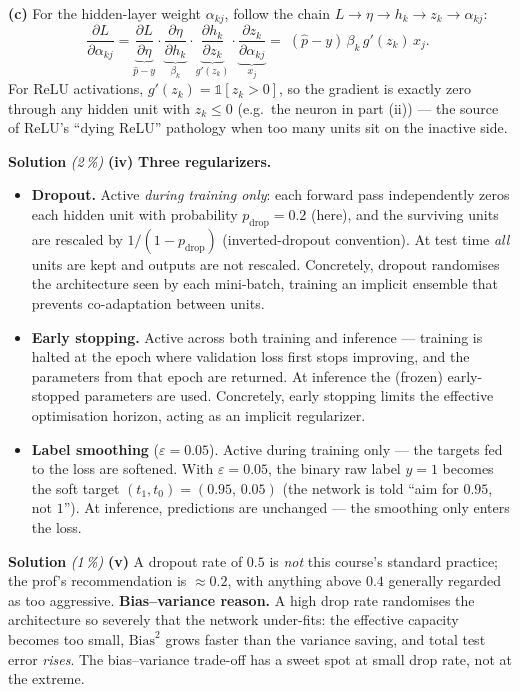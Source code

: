 \documentclass[11pt,a4paper]{article}
\newcommand{\subpoints}[1]{\textit{(#1\,\%)}}
\newcommand{\sol}{\noindent\textbf{Solution}}
\begin{document}
\textbf{(c)} For the hidden-layer weight $\alpha_{kj}$, follow the chain
$L \to \eta \to h_k \to z_k \to \alpha_{kj}$:
$$\frac{\partial L}{\partial\alpha_{kj}}
   = \underbrace{\frac{\partial L}{\partial\eta}}_{\hat p - y}\cdot
     \underbrace{\frac{\partial\eta}{\partial h_k}}_{\beta_k}\cdot
     \underbrace{\frac{\partial h_k}{\partial z_k}}_{g'(z_k)}\cdot
     \underbrace{\frac{\partial z_k}{\partial\alpha_{kj}}}_{x_j}
   = \boxed{\;(\hat p - y)\,\beta_k\, g'(z_k)\, x_j.\;}$$
For ReLU activations, $g'(z_k) = \mathbb 1[z_k > 0]$, so the gradient is exactly zero through any
hidden unit with $z_k \le 0$ (e.g.\ the neuron in part (ii)) --- the source of ReLU's ``dying ReLU''
pathology when too many units sit on the inactive side.

\medskip
\sol{} \subpoints{2} \textbf{(iv)} \textbf{Three regularizers.}
\begin{itemize}
  \item \textbf{Dropout.} Active \emph{during training only}: each forward pass independently zeros
        each hidden unit with probability $p_{\text{drop}} = 0.2$ (here), and the surviving units
        are rescaled by $1/(1 - p_{\text{drop}})$ (inverted-dropout convention). At test time
        \emph{all} units are kept and outputs are not rescaled. Concretely, dropout randomises the
        architecture seen by each mini-batch, training an implicit ensemble that prevents
        co-adaptation between units.
  \item \textbf{Early stopping.} Active across both training and inference --- training is halted
        at the epoch where validation loss first stops improving, and the parameters from that
        epoch are returned. At inference the (frozen) early-stopped parameters are used. Concretely,
        early stopping limits the effective optimisation horizon, acting as an implicit
        regularizer.
  \item \textbf{Label smoothing} ($\varepsilon = 0.05$). Active during training only --- the
        targets fed to the loss are softened. With $\varepsilon = 0.05$, the binary raw label
        $y = 1$ becomes the soft target $(t_1, t_0) = \boxed{(0.95,\, 0.05)}$ (the network is told
        ``aim for $0.95$, not $1$''). At inference, predictions are unchanged --- the smoothing
        only enters the loss.
\end{itemize}

\medskip
\sol{} \subpoints{1} \textbf{(v)} A dropout rate of $0.5$ is \emph{not} this course's standard
practice; the prof's recommendation is $\approx 0.2$, with anything above $0.4$ generally regarded
as too aggressive. \textbf{Bias--variance reason.} A high drop rate randomises the architecture so
severely that the network under-fits: the effective capacity becomes too small, $\mathrm{Bias}^2$
grows faster than the variance saving, and total test error \emph{rises}. The bias--variance
trade-off has a sweet spot at small drop rate, not at the extreme.
\end{document}
